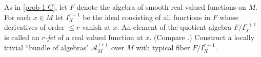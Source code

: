 \begin{problem}\label{prob-2-F}
	As in \cref{prob-1-C}, let $F$ denote the algebra of smooth
	real valued functions on $M$. For each $x\in M$ let $I^{r+1}_X$ be the ideal consisting of all functions in $F$ whose derivatives of order $\leq r$ vanish at $x$.
	An element of the quotient algebra $F/I^{r+1}_X$ is called an \textit{$r$-jet} of a real
	valued function at $x$. (Compare \cite{43}.) Construct a locally
	trivial ``bundle of algebras" $\mathcal{A}_M^{(r)}$ over $M$ with typical fiber $F/I^{r+1}_X$.
\end{problem}
